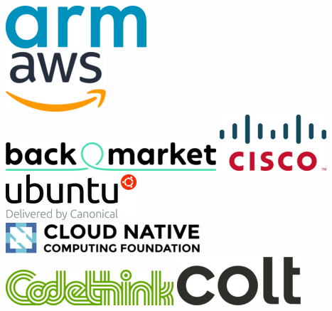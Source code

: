 \documentclass[aspectratio=169]{beamer}
\begin{document}
\begin{frame}
	\begin{columns}[t]
	\centering
		\includegraphics[scale=0.5]{images/arm.png}\\
		\vspace{0.5cm}
		\includegraphics[scale=0.5]{images/aws.png}\\
		\vspace{0.5cm}
		\includegraphics[scale=0.3]{images/backmarket.png}
	\centering
		\includegraphics[scale=0.5]{images/cisco.png}\\
		\vspace{0.4cm}
		\includegraphics[scale=0.5]{images/canonical.png}\\
		\vspace{0.4cm}
		\includegraphics[scale=0.4]{images/cncf.png}\\
		\vspace{0.4cm}
		\includegraphics[scale=0.5]{images/codethink.png}
	\centering
		\includegraphics[scale=0.2]{images/colt.png}\\

\end{columns}
\end{frame}
\end{document}
